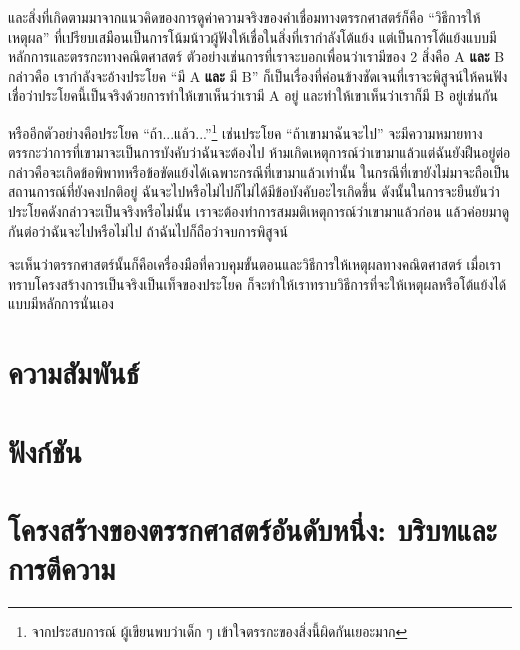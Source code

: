 และสิ่งที่เกิดตามมาจากแนวคิดของการดูค่าความจริงของคำเชื่อมทางตรรกศาสตร์ก็คือ ``วิธีการให้เหตุผล'' ที่เปรียบเสมือนเป็นการโน้มน้าวผู้ฟังให้เชื่อในสิ่งที่เรากำลังโต้แย้ง แต่เป็นการโต้แย้งแบบมีหลักการและตรรกะทางคณิตศาสตร์ ตัวอย่างเช่นการที่เราจะบอกเพื่อนว่าเรามีของ 2 สิ่งคือ A \textbf{และ} B กล่าวคือ เรากำลังจะอ้างประโยค ``มี A \textbf{และ} มี B'' ก็เป็นเรื่องที่ค่อนข้างชัดเจนที่เราจะพิสูจน์ให้คนฟังเชื่อว่าประโยคนี้เป็นจริงด้วยการทำให้เขาเห็นว่าเรามี A อยู่ และทำให้เขาเห็นว่าเราก็มี B อยู่เช่นกัน

หรืออีกตัวอย่างคือประโยค ``ถ้า...แล้ว...''\footnote{จากประสบการณ์ ผู้เขียนพบว่าเด็ก ๆ เข้าใจตรรกะของสิ่งนี้ผิดกันเยอะมาก} เช่นประโยค ``ถ้าเขามาฉันจะไป'' จะมีความหมายทางตรรกะว่าการที่เขามาจะเป็นการบังคับว่าฉันจะต้องไป ห้ามเกิดเหตุการณ์ว่าเขามาแล้วแต่ฉันยังฝืนอยู่ต่อ กล่าวคือจะเกิดข้อพิพาทหรือข้อขัดแย้งได้เฉพาะกรณีที่เขามาแล้วเท่านั้น ในกรณีที่เขายังไม่มาจะถือเป็นสถานการณ์ที่ยังคงปกติอยู่ ฉันจะไปหรือไม่ไปก็ไม่ได้มีข้อบังคับอะไรเกิดขึ้น ดังนั้นในการจะยืนยันว่าประโยคดังกล่าวจะเป็นจริงหรือไม่นั้น เราจะต้องทำการสมมติเหตุการณ์ว่าเขามาแล้วก่อน แล้วค่อยมาดูกันต่อว่าฉันจะไปหรือไม่ไป ถ้าฉันไปก็ถือว่าจบการพิสูจน์

จะเห็นว่าตรรกศาสตร์นั้นก็คือเครื่องมือที่ควบคุมขั้นตอนและวิธีการให้เหตุผลทางคณิตศาสตร์ เมื่อเราทราบโครงสร้างการเป็นจริงเป็นเท็จของประโยค ก็จะทำให้เราทราบวิธีการที่จะให้เหตุผลหรือโต้แย้งได้แบบมีหลักการนั่นเอง

\section{ความสัมพันธ์}

\section{ฟังก์ชัน}

\section{โครงสร้างของตรรกศาสตร์อันดับหนึ่ง: บริบทและการตีความ}